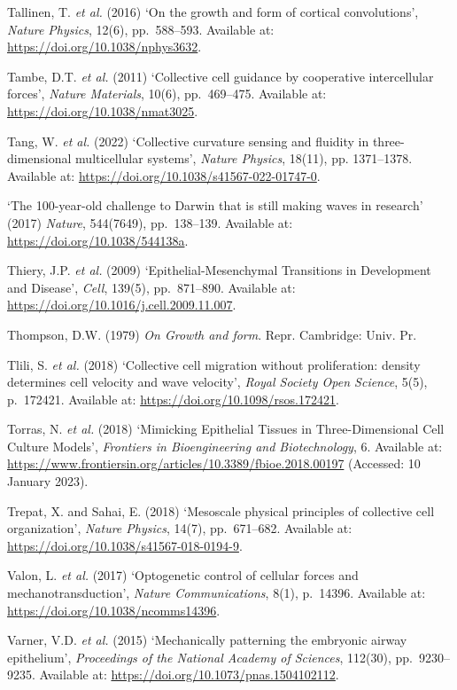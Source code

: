 \documentclass[
]{article}
\begin{document}
Tallinen, T. \emph{et al.} (2016) `On the growth and form of cortical
convolutions', \emph{Nature Physics}, 12(6), pp.~588--593. Available at:
\url{https://doi.org/10.1038/nphys3632}.

Tambe, D.T. \emph{et al.} (2011) `Collective cell guidance by
cooperative intercellular forces', \emph{Nature Materials}, 10(6),
pp.~469--475. Available at: \url{https://doi.org/10.1038/nmat3025}.

Tang, W. \emph{et al.} (2022) `Collective curvature sensing and fluidity
in three-dimensional multicellular systems', \emph{Nature Physics},
18(11), pp. 1371--1378. Available at:
\url{https://doi.org/10.1038/s41567-022-01747-0}.

`The 100-year-old challenge to Darwin that is still making waves in
research' (2017) \emph{Nature}, 544(7649), pp.~138--139. Available at:
\url{https://doi.org/10.1038/544138a}.

Thiery, J.P. \emph{et al.} (2009) `Epithelial-Mesenchymal Transitions in
Development and Disease', \emph{Cell}, 139(5), pp.~871--890. Available
at: \url{https://doi.org/10.1016/j.cell.2009.11.007}.

Thompson, D.W. (1979) \emph{On Growth and form}. Repr. Cambridge: Univ.
Pr.

Tlili, S. \emph{et al.} (2018) `Collective cell migration without
proliferation: density determines cell velocity and wave velocity',
\emph{Royal Society Open Science}, 5(5), p.~172421. Available at:
\url{https://doi.org/10.1098/rsos.172421}.

Torras, N. \emph{et al.} (2018) `Mimicking Epithelial Tissues in
Three-Dimensional Cell Culture Models', \emph{Frontiers in
Bioengineering and Biotechnology}, 6. Available at:
\url{https://www.frontiersin.org/articles/10.3389/fbioe.2018.00197}
(Accessed: 10 January 2023).

Trepat, X. and Sahai, E. (2018) `Mesoscale physical principles of
collective cell organization', \emph{Nature Physics}, 14(7),
pp.~671--682. Available at:
\url{https://doi.org/10.1038/s41567-018-0194-9}.

Valon, L. \emph{et al.} (2017) `Optogenetic control of cellular forces
and mechanotransduction', \emph{Nature Communications}, 8(1), p.~14396.
Available at: \url{https://doi.org/10.1038/ncomms14396}.

Varner, V.D. \emph{et al.} (2015) `Mechanically patterning the embryonic
airway epithelium', \emph{Proceedings of the National Academy of
Sciences}, 112(30), pp.~9230--9235. Available at:
\url{https://doi.org/10.1073/pnas.1504102112}.
\end{document}
